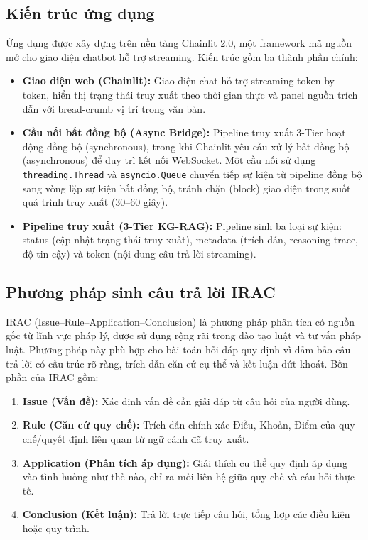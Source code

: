 \subsection{Kiến trúc ứng dụng}
\label{subsec:kientruc-ungdung}

Ứng dụng được xây dựng trên nền tảng Chainlit 2.0, một framework mã nguồn mở
cho giao diện chatbot hỗ trợ streaming. Kiến trúc gồm ba thành phần chính:

\begin{itemize}
  \item \textbf{Giao diện web (Chainlit):} Giao diện chat hỗ trợ streaming token-by-token, hiển
  thị trạng thái truy xuất theo thời gian thực và panel nguồn trích dẫn với bread-crumb vị trí trong văn bản.

  \item \textbf{Cầu nối bất đồng bộ (Async Bridge):} Pipeline truy xuất 3-Tier hoạt động đồng
  bộ (synchronous), trong khi Chainlit yêu cầu xử lý bất đồng bộ (asynchronous) để
  duy trì kết nối WebSocket. Một cầu nối sử dụng \texttt{threading.Thread} và \texttt{asyncio.Queue}
  chuyển tiếp sự kiện từ pipeline đồng bộ sang vòng lặp sự kiện bất đồng bộ, tránh
  chặn (block) giao diện trong suốt quá trình truy xuất (30--60 giây).

  \item \textbf{Pipeline truy xuất (3-Tier KG-RAG):} Pipeline sinh ba loại sự kiện: status (cập
  nhật trạng thái truy xuất), metadata (trích dẫn, reasoning trace, độ tin cậy) và
  token (nội dung câu trả lời streaming).
\end{itemize}

\subsection{Phương pháp sinh câu trả lời IRAC}
\label{subsec:phuongphap-irac}

IRAC (Issue--Rule--Application--Conclusion) là phương pháp phân tích có nguồn
gốc từ lĩnh vực pháp lý, được sử dụng rộng rãi trong đào tạo luật và tư vấn pháp luật.
Phương pháp này phù hợp cho bài toán hỏi đáp quy định vì đảm bảo câu trả lời có cấu
trúc rõ ràng, trích dẫn căn cứ cụ thể và kết luận dứt khoát. Bốn phần của IRAC gồm:

\begin{enumerate}
  \item \textbf{Issue (Vấn đề):} Xác định vấn đề cần giải đáp từ câu hỏi của người dùng.

  \item \textbf{Rule (Căn cứ quy chế):} Trích dẫn chính xác Điều, Khoản, Điểm của quy chế/quyết
  định liên quan từ ngữ cảnh đã truy xuất.

  \item \textbf{Application (Phân tích áp dụng):} Giải thích cụ thể quy định áp dụng vào tình
  huống như thế nào, chỉ ra mối liên hệ giữa quy chế và câu hỏi thực tế.

  \item \textbf{Conclusion (Kết luận):} Trả lời trực tiếp câu hỏi, tổng hợp các điều kiện hoặc quy
  trình.
\end{enumerate}

